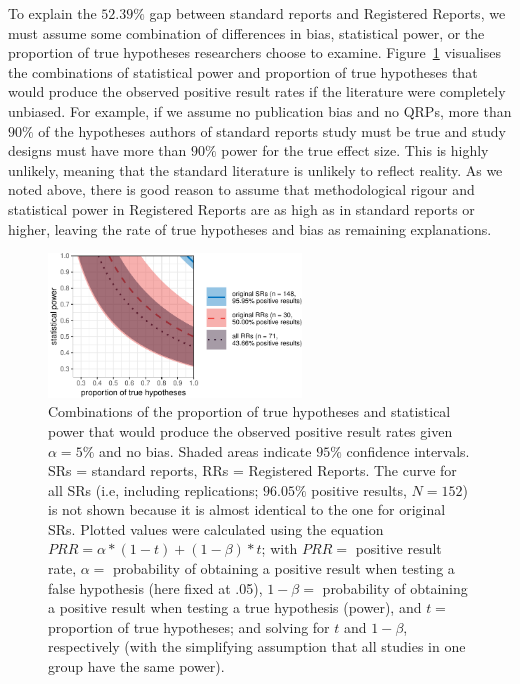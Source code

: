 \documentclass[british,,jou,floatsintext]{apa6}
\begin{document}
To explain the \(52.39 \%\) gap between standard reports and Registered Reports, we must assume some combination of differences in bias, statistical power, or the proportion of true hypotheses researchers choose to examine.
Figure~\ref{fig:powerbaserate} visualises the combinations of statistical power and proportion of true hypotheses that would produce the observed positive result rates if the literature were completely unbiased.
For example, if we assume no publication bias and no QRPs, more than \(90\%\) of the hypotheses authors of standard reports study must be true and study designs must have more than \(90\%\) power for the true effect size.
This is highly unlikely, meaning that the standard literature is unlikely to reflect reality.
As we noted above, there is good reason to assume that methodological rigour and statistical power in Registered Reports are as high as in standard reports or higher, leaving the rate of true hypotheses and bias as remaining explanations.



\begin{figure}

{\centering \includegraphics[width=0.6\textwidth]{manuscript_files/figure-latex/powerbaserate-1} 

}

\caption{Combinations of the proportion of true hypotheses and statistical power that would produce the observed positive result rates given \(\alpha = 5 \%\) and no bias. Shaded areas indicate \(95\%\) confidence intervals. SRs = standard reports, RRs = Registered Reports. The curve for all SRs (i.e, including replications; \(96.05 \%\) positive results, \(N = 152\)) is not shown because it is almost identical to the one for original SRs. Plotted values were calculated using the equation \(PRR = \alpha*(1-t) + (1-\beta)*t\); with \(PRR =\) positive result rate, \(\alpha =\) probability of obtaining a positive result when testing a false hypothesis (here fixed at .05), \(1-\beta =\) probability of obtaining a positive result when testing a true hypothesis (power), and \(t =\) proportion of true hypotheses; and solving for \(t\) and \(1-\beta\), respectively (with the simplifying assumption that all studies in one group have the same power).}\label{fig:powerbaserate}
\end{figure}
\end{document}
